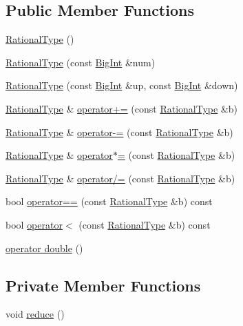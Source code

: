 \subsection*{Public Member Functions}
\begin{DoxyCompactItemize}
\item 
\hyperlink{class_rational_type_a56acb42164affebe8d27a333eadfeb94}{Rational\+Type} ()
\item 
\hyperlink{class_rational_type_a2d1c2b4f68c9bddd74c299c470ed44fb}{Rational\+Type} (const \hyperlink{class_big_int}{Big\+Int} \&num)
\item 
\hyperlink{class_rational_type_a3e2add02a28225b077eb8c5f8bde025c}{Rational\+Type} (const \hyperlink{class_big_int}{Big\+Int} \&up, const \hyperlink{class_big_int}{Big\+Int} \&down)
\item 
\hyperlink{class_rational_type}{Rational\+Type} \& \hyperlink{class_rational_type_a1a1f4ed1f3830f6c4d161d54f59c6e9c}{operator+=} (const \hyperlink{class_rational_type}{Rational\+Type} \&b)
\item 
\hyperlink{class_rational_type}{Rational\+Type} \& \hyperlink{class_rational_type_a6881a9f8aa0f189c3cff2305f721c414}{operator-\/=} (const \hyperlink{class_rational_type}{Rational\+Type} \&b)
\item 
\hyperlink{class_rational_type}{Rational\+Type} \& \hyperlink{class_rational_type_a1d5f9a09c2fca52e24d6b167359d6ea5}{operator$\ast$=} (const \hyperlink{class_rational_type}{Rational\+Type} \&b)
\item 
\hyperlink{class_rational_type}{Rational\+Type} \& \hyperlink{class_rational_type_a3635767c9f938bce5c6310ddc1c44801}{operator/=} (const \hyperlink{class_rational_type}{Rational\+Type} \&b)
\item 
bool \hyperlink{class_rational_type_a117224a9c64829b181d814ff0fc7f34f}{operator==} (const \hyperlink{class_rational_type}{Rational\+Type} \&b) const 
\item 
bool \hyperlink{class_rational_type_a1dd34debca7b71efec5b70740bd9f4ff}{operator$<$} (const \hyperlink{class_rational_type}{Rational\+Type} \&b) const 
\item 
\hyperlink{class_rational_type_a82ffd1cfc06edee058b86122a99acf99}{operator double} ()
\end{DoxyCompactItemize}
\subsection*{Private Member Functions}
\begin{DoxyCompactItemize}
\item 
void \hyperlink{class_rational_type_ab0173d0fb9a0ca208d52cae36adee9bc}{reduce} ()
\end{DoxyCompactItemize}

